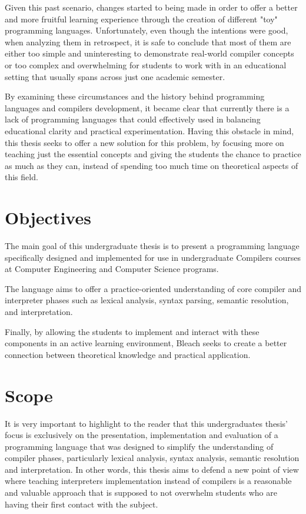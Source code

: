 Given this past scenario, changes started to being made in order to offer a better and more fruitful learning experience through the creation of different "toy" programming languages. Unfortunately, even though the intentions were good, when analyzing them in retrospect, it is safe to conclude that most of them are either too simple and uninteresting to demonstrate real-world compiler concepts or too complex and overwhelming for students to work with in an educational setting that usually spans across just one academic semester.

By examining these circumstances and the history behind programming languages and compilers development, it became clear that currently there is a lack of programming languages that could effectively used in balancing educational clarity and practical experimentation. Having this obstacle in mind, this thesis seeks to offer a new solution for this problem, by focusing more on teaching just the essential concepts and giving the students the chance to practice as much as they can, instead of spending too much time on theoretical aspects of this field.

\section{Objectives}
The main goal of this undergraduate thesis is to present a programming language specifically designed and implemented for use in undergraduate Compilers courses at Computer Engineering and Computer Science programs.

The language aims to offer a practice-oriented understanding of core compiler and interpreter phases such as lexical analysis, syntax parsing, semantic resolution, and interpretation.

Finally, by allowing the students to implement and interact with these components in an active learning environment, Bleach seeks to create a better connection between theoretical knowledge and practical application.

\section{Scope}
It is very important to highlight to the reader that this undergraduates thesis' focus is exclusively on the presentation, implementation and evaluation of a programming language that was designed to simplify the understanding of compiler phases, particularly lexical analysis, syntax analysis, semantic resolution and interpretation. In other words, this thesis aims to defend a new point of view where teaching interpreters implementation instead of compilers is a reasonable and valuable approach that is supposed to not overwhelm students who are having their first contact with the subject. 

